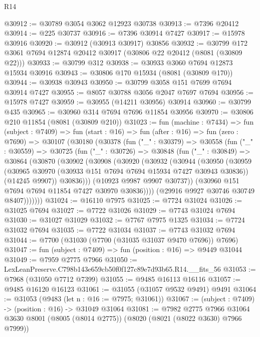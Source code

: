 \begin{lexlean}{R14}
\begin{coremodule}
@30912 := @30789 @3054 @3062 @12923 @30738
@30913 := @7396 @20412
@30914 := @225 @30737
@30916 := @7396 @30914 @7427
@30917 := @15978 @30916
@30920 := @30912 (@30913 @30917) @30856
@30932 := @30799 @172 @3061 @7694 @12874 @20412 @30917 (@30806 @22 @20412 (@8081 (@30809 @22)))
@30933 := @30799 @312
@30938 := @30933 @3060 @7694 @12873 @15934 @30916
@30943 := @30806 @170 @15934 (@8081 (@30809 @170))
@30944 := @30938 @30943
@30950 := @30799 @3058 @151 @7699 @7694 @30914 @7427
@30955 := @8057 @30788 @3056 @2047 @7697 @7694
@30956 := @15978 @7427
@30959 := @30955 (@14211 @30956) @30914
@30960 := @30799 @435
@30965 := @30960 @314 @7694 @7696 @11854 @30956
@30970 := @30806 @210 @11854 (@8081 (@30809 @210))
@31023 := fun (machine : @7434) =>
  fun (subject : @7409) =>
  fun (start : @16) =>
  fun (after : @16) =>
  fun (zero : @7690) =>
  @30107
    (@30180
      (@30378
        (fun ("_" : @30379) =>
        @30558
          (fun ("_" : @30559) =>
          @30725
            (fun ("_" : @30726) =>
            @30848
              (fun ("_" : @30849) =>
              @30864
                (@30870
                  (@30902
                    (@30908
                      (@30920
                        (@30932
                          (@30944
                            (@30950
                              (@30959
                                (@30965 @30970 (@30933 @151 @7694 @7694 @15934 @7427 @30943 @30836))
                                (@14245 @9907))
                              @30836)))
                        (@10923 @9987 @9907 @30737))
                      (@30960 @151 @7694 @7694 @11854 @7427 @30970 @30836))))
                (@29916 @9927 @30746 @30749 @8407)))))))
@31024 := @16110 @7975
@31025 := @7724 @31024
@31026 := @31025 @7694
@31027 := @7722 @31026
@31029 := @7743 @31024 @7694
@31030 := @31027 @31029
@31032 := @7767 @7975 @1325
@31034 := @7724 @31032 @7694
@31035 := @7722 @31034
@31037 := @7743 @31032 @7694
@31044 := @7700 (@31030 (@7700 (@31035 @31037 @9470 @7696)) @7696)
@31047 := fun (subject : @7409) => fun (position : @16) => @9449 @31044
@31049 := @7959 @2775 @7966
@31050 := LexLeanPreserve.C798b143e659cb50f0f127c89e7d93b65.R14.__fits_56
@31053 := @7968 (@31050 @7712 @7399)
@31055 := @9485 @16113 @16116
@31057 := @9485 @16120 @16123
@31061 := @31055 (@31057 @9532 @9491) @9491
@31064 := @31053 (@9483 (let n : @16 := @7975; @31061))
@31067 := (subject : @7409) -> (position : @16) -> @31049 @31064
@31081 := @7982
    @2775
    @7966
    @31064
    @3630
    @8001
    (@8005 (@8014 @2775))
    (@8020 (@8021 (@8022 @3630) @7966 @7999))

\end{coremodule}
\end{lexlean}
